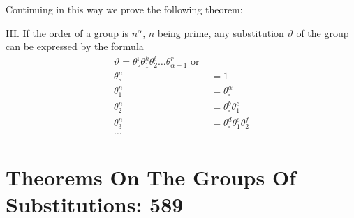 \documentclass[11pt,fancy]{elegantbook}
\begin{document}
Continuing in this way we prove the following theorem:
\begin{theorem}
III. If the order of a group is $n^\alpha$, $n$ being prime, any substitution $\vartheta$ of the group can be expressed by the formula \begin{equation}
\begin{aligned}
    \vartheta=\theta_\circ^{\imath}\theta_1^{k}\theta_2^{\ell} \dots \theta_{\alpha-1}^{r} \text{ or } \\
    \theta_\circ^{n}&=1 \\
    \theta_1^{n}&=\theta_\circ^{\alpha} \\
    \theta_2^{n}&=\theta_\circ^{b}\theta_1^{c} \\
    \theta_3^{n}&=\theta_\circ^{d}\theta_1^{e}\theta_2^
{f} \\
\dots
\end{aligned}
\end{equation} 
\end{theorem} 


\section{Theorems On The Groups Of Substitutions: 589}
\end{document}
